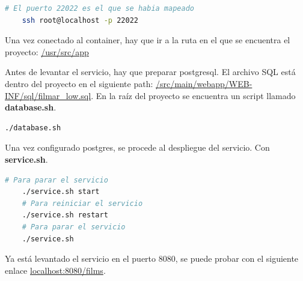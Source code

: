\begin{lstlisting}[language=bash, caption=Conexión ssh]
    # El puerto 22022 es el que se habia mapeado
    ssh root@localhost -p 22022
\end{lstlisting}

Una vez conectado al container, hay que ir a la ruta en el que se encuentra el proyecto: \url{/usr/src/app}

Antes de levantar el servicio, hay que preparar postgresql. El archivo SQL está dentro del proyecto
en el siguiente path: \url{/src/main/webapp/WEB-INF/sql/filmar_low.sql}. En la raíz del proyecto se 
encuentra un script llamado \textbf{database.sh}.

\begin{lstlisting}[language=bash, caption=Configuración postgresql]
    ./database.sh
\end{lstlisting}

Una vez configurado postgres, se procede al despliegue del servicio. Con \textbf{service.sh}.

\begin{lstlisting}[language=bash, caption=Despliegue]
    # Para parar el servicio
    ./service.sh start
    # Para reiniciar el servicio
    ./service.sh restart
    # Para parar el servicio
    ./service.sh
\end{lstlisting}

Ya está levantado el servicio en el puerto 8080, se puede probar con el siguiente enlace
\url{localhost:8080/films}.

